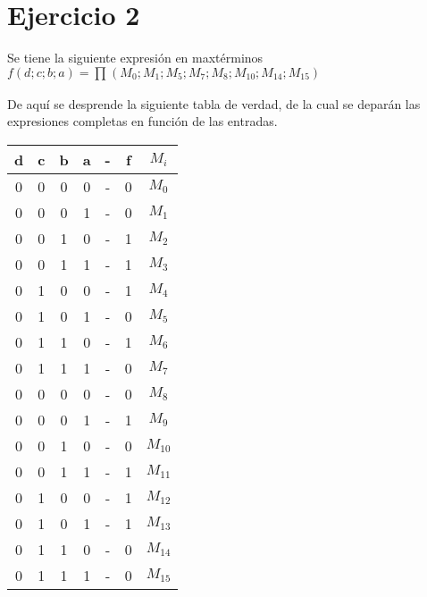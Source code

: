 \documentclass[../../informe/src/main.tex]{subfiles}
\begin{document}
	\section{Ejercicio 2}
	Se tiene la siguiente expresión en maxtérminos $f(d;c;b;a) = \prod_{}^{}(M_{0};M_{1};M_{5};M_{7};M_{8};M_{10};M_{14};M_{15})$ \par
	De aquí se desprende la siguiente tabla de verdad, de la cual se deparán las expresiones completas en función de las entradas.
	\begin{table}[H]
		\centering
 			\begin{tabular}{||c c c c c c c||} 
 				\hline
				d & c & b & a & - & f & $M_{i}$\\ [0.5ex] 
 				\hline\hline
 					0 & 0 & 0 & 0 & - & 0 & $M_{0}$ \\
 					0 & 0 & 0 & 1 & - & 0 & $M_{1}$ \\
 					0 & 0 & 1 & 0 & - & 1 & $M_{2}$ \\
 					0 & 0 & 1 & 1 & - & 1 & $M_{3}$ \\
 					0 & 1 & 0 & 0 & - & 1 & $M_{4}$ \\
 					0 & 1 & 0 & 1 & - & 0 & $M_{5}$ \\
 					0 & 1 & 1 & 0 & - & 1 & $M_{6}$ \\
 					0 & 1 & 1 & 1 & - & 0 & $M_{7}$ \\
 					0 & 0 & 0 & 0 & - & 0 & $M_{8}$ \\
 					0 & 0 & 0 & 1 & - & 1 & $M_{9}$ \\
 					0 & 0 & 1 & 0 & - & 0 & $M_{10}$ \\
 					0 & 0 & 1 & 1 & - & 1 & $M_{11}$ \\
 					0 & 1 & 0 & 0 & - & 1 & $M_{12}$ \\
 					0 & 1 & 0 & 1 & - & 1 & $M_{13}$ \\
 					0 & 1 & 1 & 0 & - & 0 & $M_{14}$ \\
 					0 & 1 & 1 & 1 & - & 0 & $M_{15}$ \\ [1ex] 
 				\hline
  	\end{tabular}
	\end{table} \par
	
\end{document}
